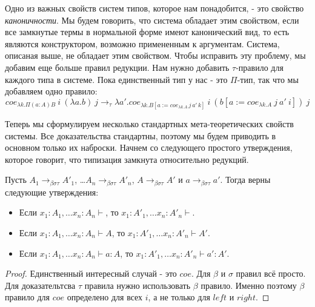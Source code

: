 \documentclass{amsart}
\theoremstyle{definition}
\theoremstyle{remark}
\newcommand{\bs}{\beta\sigma}
\newcommand{\bst}{\bs\tau}
\newcommand{\rbst}{\to_{\bst}}
\numberwithin{figure}{section}
\begin{document}
Одно из важных свойств систем типов, которое нам понадобится, - это свойство \emph{каноничности}.
Мы будем говорить, что система обладает этим свойством, если все замкнутые термы в нормальной форме имеют канонический вид,
    то есть являются конструктором, возможно примененным к аргументам.
Система, описаная выше, не обладает этим свойством.
Чтобы исправить эту проблему, мы добавим еще больше правил редукции.
Нам нужно добавить $\tau$-правило для каждого типа в системе.
Пока единственный тип у нас - это $\Pi$-тип, так что мы добавляем одно правило:
\[ coe_{\lambda k. \Pi (a : A) B}\ i\ (\lambda a. b)\ j \to_\tau \lambda a'. coe_{\lambda k. B[a := coe_{\lambda k. A}\,j\,a'\,k]}\ i\ (b[a := coe_{\lambda k. A}\ j\ a'\ i])\ j \]

Теперь мы сформулируем несколько стандартных мета-теоретических свойств системы.
Все доказательства стандартны, поэтому мы будем приводить в основном только их наброски.
Начнем со следующего простого утверждения, которое говорит, что типизация замкнута относительно редукций.
\begin{prop}
Пусть $A_1 \rbst A'_1$, \ldots $A_n \rbst A'_n$, $A \rbst A'$ и $a \rbst a'$.
Тогда верны следующие утверждения:
\begin{itemize}
\item Если $x_1 : A_1, \ldots x_n : A_n \vdash$, то $x_1 : A'_1, \ldots x_n : A'_n \vdash$.
\item Если $x_1 : A_1, \ldots x_n : A_n \vdash A$, то $x_1 : A'_1, \ldots x_n : A'_n \vdash A'$.
\item Если $x_1 : A_1, \ldots x_n : A_n \vdash a : A$, то $x_1 : A'_1, \ldots x_n : A'_n \vdash a' : A'$.
\end{itemize}
\end{prop}
\begin{proof}
Единственный интересный случай - это $coe$.
Для $\beta$ и $\sigma$ правил всё просто.
Для доказательтсва $\tau$ правила нужно использовать $\beta$ правило.
Именно поэтому $\beta$ правило для $coe$ определено для всех $i$, а не только для $left$ и $right$.
\end{proof}
\end{document}
